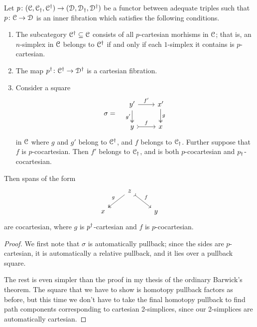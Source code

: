 \documentclass[main.tex]{subfiles}
\begin{document}
\begin{theorem}
  \label{thm:new_barwick}
  Let $p\colon (\mathcal{C}, \mathcal{C}_{\dagger}, \mathcal{C}^{\dagger}) \to (\mathcal{D}, \mathcal{D}_{\dagger}, \mathcal{D}^{\dagger})$ be a functor between adequate triples such that $p\colon \mathcal{C} \to \mathcal{D}$ is an inner fibration which satisfies the following conditions.
  \begin{enumerate}
    \item The subcategory $\mathcal{C}^{\dagger} \subseteq \mathcal{C}$ consists of all $p$-cartesian morhisms in $\mathcal{C}$; that is, an $n$-simplex in $\mathcal{C}$ belongs to $\mathcal{C}^{\dagger}$ if and only if each $1$-simplex it contains is $p$-cartesian.

    \item The map $p^{\dagger}\colon \mathcal{C}^{\dagger} \to \mathcal{D}^{\dagger}$ is a cartesian fibration.

    \item Consider a square
      \begin{equation*}
          \sigma = \quad
          \begin{tikzcd}
            y'
            \arrow[r, "f'"]
            \arrow[d, two heads, swap, "g'"]
            & x'
            \arrow[d, two heads, "g"]
            \\
            y
            \arrow[r, rightarrowtail, "f"]
            & x
          \end{tikzcd}
      \end{equation*}
      in $\mathcal{C}$ where $g$ and $g'$ belong to $\mathcal{C}^{\dagger}$, and $f$ belongs to $\mathcal{C}_{\dagger}$. Further suppose that $f$ is $p$-cocartesian. Then $f'$ belongs to $\mathcal{C}_{\dagger}$, and is both $p$-cocartesian and $p_{\dagger}$-cocartesian.
  \end{enumerate}
  Then spans of the form
  \begin{equation*}
    \begin{tikzcd}
      & z
      \arrow[dl, two heads, swap, "g"]
      \arrow[dr, rightarrowtail, "f"]
      \\
      x
      && y
    \end{tikzcd}
  \end{equation*}
  are cocartesian, where $g$ is $p^{\dagger}$-cartesian and $f$ is $p$-cocartesian.
\end{theorem}
\begin{proof}
  We first note that $\sigma$ is automatically pullback; since the sides are $p$-cartesian, it is automatically a relative pullback, and it lies over a pullback square.

  The rest is even simpler than the proof in my thesis of the ordinary Barwick's theorem. The square that we have to show is homotopy pullback factors as before, but this time we don't have to take the final homotopy pullback to find path components corresponding to cartesian 2-simplices, since our 2-simplices are automatically cartesian.
\end{proof}
\end{document}
